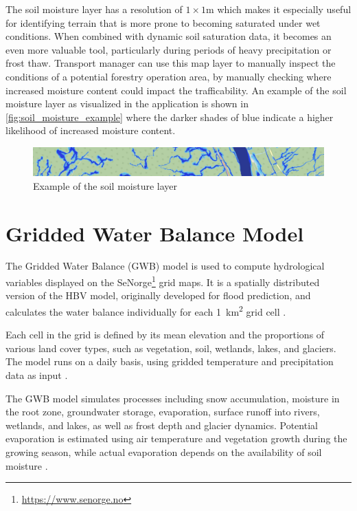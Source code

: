 The soil moisture layer has a resolution of $1 \times 1$m which makes it especially useful for identifying terrain that is more prone to becoming saturated under wet conditions. When combined with dynamic soil saturation data, it becomes an even more valuable tool, particularly during periods of heavy precipitation or frost thaw. Transport manager can use this map layer to manually inspect the conditions of a potential forestry operation area, by manually checking where increased moisture content could impact the trafficability. An example of the soil moisture layer as visualized in the application is shown in \autoref{fig:soil_moisture_example} where the darker shades of blue indicate a higher likelihood of increased moisture content.

\begin{figure}[h]
    \centering
    \includegraphics[width=1\linewidth]{images/maplayers/markfuktighet.png}
    \caption{Example of the soil moisture layer}
    \label{fig:soil_moisture_example}
\end{figure}

\section{Gridded Water Balance Model}

The Gridded Water Balance (GWB) model is used to compute hydrological variables displayed on the SeNorge\footnote{\url{https://www.senorge.no}} grid maps. It is a spatially distributed version of the HBV model, originally developed for flood prediction, and calculates the water balance individually for each \qty{1}{\kilo\meter\squared} grid cell \cite{nve2025waterdata}.

Each cell in the grid is defined by its mean elevation and the proportions of various land cover types, such as vegetation, soil, wetlands, lakes, and glaciers. The model runs on a daily basis, using gridded temperature and precipitation data as input \cite{nve2025waterdata}.

The GWB model simulates processes including snow accumulation, moisture in the root zone, groundwater storage, evaporation, surface runoff into rivers, wetlands, and lakes, as well as frost depth and glacier dynamics. Potential evaporation is estimated using air temperature and vegetation growth during the growing season, while actual evaporation depends on the availability of soil moisture \cite{nve2025waterdata}.

